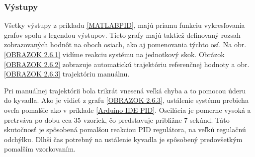 \subsubsection{Výstupy}

Všetky výstupy z príkladu \ref{MATLABPID}, majú priamu funkciu vykresľovania grafov spolu s legendou výstupov. Tieto grafy majú taktiež definovaný rozsah zobrazovaných hodnôt na oboch osiach, ako aj pomenovania týchto osí. Na obr.\ref{OBRAZOK 2.6.1} vidíme reakciu systému na jednotkový skok. Obrázok \ref{OBRAZOK 2.6.2} zobrazuje automatickú trajektóriu referenčnej hodnoty a obr.\ref{OBRAZOK 2.6.3} trajektóriu manuálnu. 

Pri manuálnej trajektórii bola trikrát vnesená veľká chyba a to pomocou úderu do kyvadla. Ako je vidieť z grafu \ref{OBRAZOK 2.6.3}, ustálenie systému prebieha oveľa pomalšie ako v príklade \ref{Arduino IDE PID}. Oscilácia je pomerne vysoká a pretrváva po dobu cca 35 vzoriek, čo predstavuje približne 7 sekúnd. Táto skutočnosť je spôsobená pomalšou reakciou PID regulátora, na veľkú regulačnú odchýlku. Dlhší čas potrebný na ustálenie kyvadla je spôsobený predovšetkým pomalším vzorkovaním.  
\vspace{6cm}

